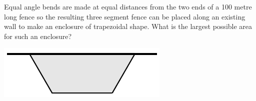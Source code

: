 \begin{eg}\label{eg:MXMNtapezoidalFence}
Equal angle bends are made at equal distances from the two ends of a
100 metre long fence so the resulting three segment fence can be placed
along an existing wall to make an enclosure of trapezoidal shape. What
is the largest possible area for such an enclosure?
\begin{efig}
\begin{center}
   \includegraphics{fenceA.pdf}
\end{center}
\end{efig}



\end{eg}
